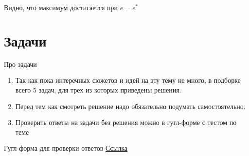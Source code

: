 \smallskip\indent\setlength{\parindent}{1em}Видно, что максимум достигается при $e=e^*$

\newpage


\section{Задачи}

\begin{mybox}{Про задачи}
    \begin{enumerate}
        \item Так как пока интеречных сюжетов и идей на эту тему не много, в подборке всего 5 задач, для трех из
        которых приведены решения.
        \item Перед тем как смотреть решение надо обязательно подумать самостоятельно.
        \item Проверить ответы на задачи без решения можно в гугл-форме с тестом по теме
    \end{enumerate}
\end{mybox}

\begin{mybox}{Гугл-форма для проверки ответов}
    \href{https://forms.gle/F2zMM9MwLUfXKEod7}{Ссылка}
\end{mybox}

